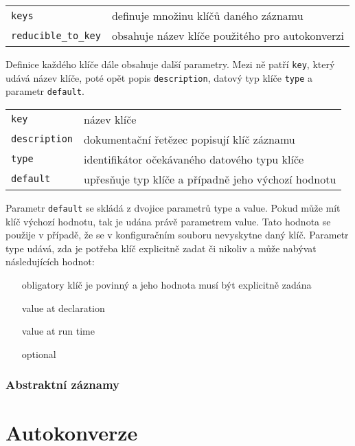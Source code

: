 \documentclass[FM,bw,DP]{tulthesis}
\begin{document}
\vspace{0.5cm}
\begin{tabular}{m{4cm}@{}l}
\texttt{keys}\dotfill & definuje množinu klíčů daného záznamu \\
\texttt{reducible\_to\_key}\dotfill & obsahuje název klíče použitého pro autokonverzi \\
\end{tabular}
\vspace{0.5cm}

Definice každého klíče dále obsahuje další parametry. Mezi ně patří \texttt{key}, který udává název klíče, poté opět popis \texttt{description}, datový typ klíče \texttt{type} a parametr \texttt{default}.

\vspace{0.5cm}
\begin{tabular}{m{4cm}@{}l}
\texttt{key}\dotfill & název klíče \\
\texttt{description}\dotfill & dokumentační řetězec popisují klíč záznamu \\
\texttt{type}\dotfill & identifikátor očekávaného datového typu klíče \\
\texttt{default}\dotfill & upřesňuje typ klíče a případně jeho výchozí hodnotu \\
\end{tabular}
\vspace{0.5cm}

Parametr \texttt{default} se skládá z dvojice parametrů type a value. Pokud může mít klíč výchozí hodnotu, tak je udána právě parametrem value. Tato hodnota se použije v případě, že se v konfiguračním souboru nevyskytne daný klíč. Parametr type udává, zda je potřeba klíč explicitně zadat či nikoliv a může nabývat následujících hodnot:

\begin{itemize}
\item[obligatory] klíč je povinný a jeho hodnota musí být explicitně zadána
\item[value at declaration] 
\item[value at run time] 
\item[optional] 
\end{itemize}

\subsubsection{Abstraktní záznamy}

\section{Autokonverze}
\end{document}
